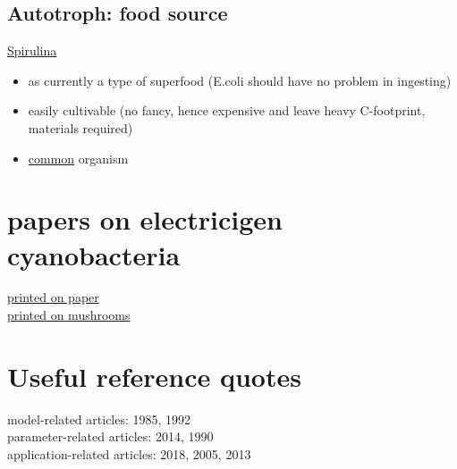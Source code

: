 \documentclass[a4paper,11pt]{article}
\begin{document}
    \subsection{Autotroph: food source}
    \href{https://www.researchgate.net/publication/259495650_Spirulina_Cultivation_A_Review}{Spirulina}\autocite{usharani2012spirulina}
    \begin{itemize}
        \item as currently a type of superfood (E.coli should have no problem in ingesting)
        \item easily cultivable (no fancy, hence expensive and leave heavy C-footprint, materials required)
        \item \href{https://microbewiki.kenyon.edu/index.php/Arthrospira_platensis}{common} organism
    \end{itemize}
    
    \section{papers on electricigen cyanobacteria}
    \href{https://www.nature.com/articles/s41467-017-01084-4/}{printed on paper}\\
    \href{sci-hub.se/10.1021/acs.nanolett.8b02642}{printed on mushrooms}
    
    \section{Useful reference quotes}
    model-related articles: 1985\autocite{bratbak1985phytoplankton}, 1992\autocite{sanders1992relationships}\\
    parameter-related articles: 2014\autocite{beliaev2014inference}, 1990\autocite{currie1990large}\\
    application-related articles: 2018\autocite{light2018flavin}, 2005\autocite{reguera2005extracellular}, 2013\autocite{xie2013microbial}
\end{document}
